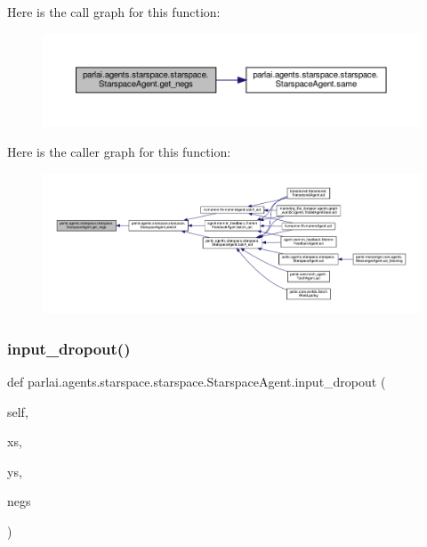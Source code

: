 Here is the call graph for this function\+:
\nopagebreak
\begin{figure}[H]
\begin{center}
\leavevmode
\includegraphics[width=350pt]{classparlai_1_1agents_1_1starspace_1_1starspace_1_1StarspaceAgent_a9591d5f485debcf4611e24be38900b5e_cgraph}
\end{center}
\end{figure}
Here is the caller graph for this function\+:
\nopagebreak
\begin{figure}[H]
\begin{center}
\leavevmode
\includegraphics[width=350pt]{classparlai_1_1agents_1_1starspace_1_1starspace_1_1StarspaceAgent_a9591d5f485debcf4611e24be38900b5e_icgraph}
\end{center}
\end{figure}
\mbox{\label{classparlai_1_1agents_1_1starspace_1_1starspace_1_1StarspaceAgent_a6511fc8a4d2687cd99a981b4e3b6a589}} 
\subsubsection{\texorpdfstring{input\+\_\+dropout()}{input\_dropout()}}
{\footnotesize\ttfamily def parlai.\+agents.\+starspace.\+starspace.\+Starspace\+Agent.\+input\+\_\+dropout (\begin{DoxyParamCaption}\item[{}]{self,  }\item[{}]{xs,  }\item[{}]{ys,  }\item[{}]{negs }\end{DoxyParamCaption})}



